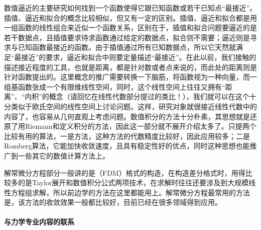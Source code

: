 \begin{figwindow}
    数值逼近的主要研究如何找到一个函数使得它跟已知函数或若干已知点“最接近”。插值、逼近和拟合的概念比较相似，但又有一定的区别。插值、逼近和拟合都是用一组函数的线性组合来近似一个函数关系，区别在于，插值和拟合问题要逼近的是若干数据点，且插值要求待求函数通过给定的数据点，拟合则不需要；逼近则是寻求与已知函数最接近的函数。由于插值通过所有已知数据点，所以它天然就满足“最接近”的要求，逼近和拟合中则要定量描述“最接近”。在此以前，我们接触的描述接近程度的工具，也就是距离，都是针对数或者点来说的，而此处的距离则是针对函数提出的。这里概念的推广需要转换一下脑筋，将函数视为一种向量，而一组基函数张成一个有限维线性空间，同时，这个线性空间上往往又拥有“距离”、“内积”的概念（请回忆在线性代数部分提过的类比！），我们就可以在这个十分类似于欧氏空间的线性空间上讨论问题。这样，研究对象就很接近线性代数中的内容了，也容易从几何直观上考虑问题。数值积分的方法十分朴素，其思想就是还原了用Riemann和定义积分的方法，因此这一部分就不展开介绍太多了。只提两个比较有用的算法，一是方法，这种方法的代数精度比较好，因此应用较多；二是Romberg算法，它能加快收敛速度，且具有稳定性好的优点，同时这种思想也能推广到一些其它的数值计算方法上。
\end{figwindow}

解常微分方程部分一般讲的是（FDM）格式的构造，在构造差分格式时，用得比较多的是Taylor展开和数值积分公式两项技术，在求解时往往还要涉及到大规模线性方程组求解，所以前边学的方法在这里都能用上。解常微分方程最常用的方法是，该方法的收敛效果一般都比较好，目前已经在很多领域得到应用。

\paragraph{与力学专业内容的联系}

